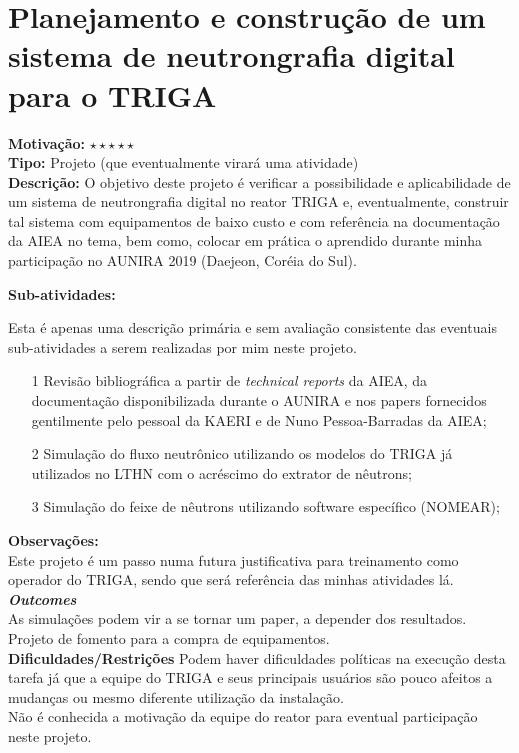 \chapter{Planejamento e construção de um sistema de neutrongrafia digital para o TRIGA}

\textbf{Motivação:} $\star\star\star\star\star$\\

\textbf{Tipo:} Projeto (que eventualmente virará  uma atividade)\\

\textbf{Descrição:} O objetivo deste projeto é verificar a possibilidade e aplicabilidade de um sistema
de neutrongrafia digital no reator TRIGA e, eventualmente, construir tal sistema com equipamentos
de baixo custo e com referência na documentação da AIEA no tema, bem como, colocar em prática
o aprendido durante minha participação no AUNIRA 2019 (Daejeon, Coréia do Sul).

\textbf{Sub-atividades:}

Esta é apenas uma descrição primária e sem avaliação consistente das eventuais 
sub-atividades a serem realizadas por mim neste projeto.

\begin{itemize}
\item[1] Revisão bibliográfica a partir de \textit{technical reports} da AIEA, da documentação
  disponibilizada durante o AUNIRA e nos papers fornecidos gentilmente pelo pessoal da KAERI e
  de Nuno Pessoa-Barradas da AIEA;
\item[2] Simulação do fluxo neutrônico utilizando os modelos do TRIGA já utilizados no LTHN com
  o acréscimo do extrator de nêutrons;
  \item[3] Simulação do feixe de nêutrons utilizando software específico (NOMEAR);
\end{itemize}

\textbf{Observações:}\\

Este projeto é um passo numa futura justificativa para treinamento como operador do TRIGA, sendo que será referência das minhas atividades lá.\\

\textbf{\textit{Outcomes}}\\

  As simulações podem vir a se tornar um paper, a depender dos resultados.\\

  Projeto de fomento para a compra de equipamentos.\\

\textbf{Dificuldades/Restrições}
Podem haver dificuldades políticas na execução desta tarefa já que a equipe do TRIGA e seus principais
usuários são pouco afeitos a mudanças ou mesmo diferente utilização da instalação.\\

Não é conhecida a motivação da equipe do reator para eventual participação neste projeto.


